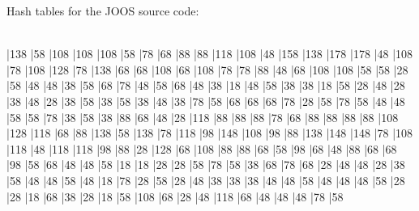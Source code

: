 \begin{slide*}
Hash tables for the JOOS source code:\\
~\\
\begin{barenv}
\setlength{\unitlength}{0.6pt}
\bar{13}{8}
\bar{5}{8}
\bar{10}{8}
\bar{10}{8}
\bar{10}{8}
\bar{5}{8}
\bar{7}{8}
\bar{6}{8}
\bar{8}{8}
\bar{8}{8}
\bar{11}{8}
\bar{10}{8}
\bar{4}{8}
\bar{15}{8}
\bar{13}{8}
\bar{17}{8}
\bar{17}{8}
\bar{4}{8}
\bar{10}{8}
\bar{7}{8}
\bar{10}{8}
\bar{12}{8}
\bar{7}{8}
\bar{13}{8}
\bar{6}{8}
\bar{6}{8}
\bar{10}{8}
\bar{6}{8}
\bar{10}{8}
\bar{7}{8}
\bar{7}{8}
\bar{8}{8}
\bar{4}{8}
\bar{6}{8}
\bar{10}{8}
\bar{10}{8}
\bar{5}{8}
\bar{5}{8}
\bar{2}{8}
\bar{5}{8}
\bar{4}{8}
\bar{4}{8}
\bar{3}{8}
\bar{5}{8}
\bar{6}{8}
\bar{7}{8}
\bar{4}{8}
\bar{5}{8}
\bar{6}{8}
\bar{4}{8}
\bar{3}{8}
\bar{1}{8}
\bar{4}{8}
\bar{5}{8}
\bar{3}{8}
\bar{3}{8}
\bar{1}{8}
\bar{5}{8}
\bar{2}{8}
\bar{4}{8}
\bar{2}{8}
\bar{3}{8}
\bar{4}{8}
\bar{2}{8}
\bar{3}{8}
\bar{5}{8}
\bar{3}{8}
\bar{5}{8}
\bar{3}{8}
\bar{4}{8}
\bar{3}{8}
\bar{7}{8}
\bar{5}{8}
\bar{6}{8}
\bar{6}{8}
\bar{6}{8}
\bar{7}{8}
\bar{2}{8}
\bar{5}{8}
\bar{7}{8}
\bar{5}{8}
\bar{4}{8}
\bar{4}{8}
\bar{5}{8}
\bar{5}{8}
\bar{7}{8}
\bar{3}{8}
\bar{5}{8}
\bar{3}{8}
\bar{8}{8}
\bar{6}{8}
\bar{4}{8}
\bar{2}{8}
\bar{11}{8}
\bar{8}{8}
\bar{8}{8}
\bar{8}{8}
\bar{7}{8}
\bar{6}{8}
\bar{8}{8}
\bar{8}{8}
\bar{8}{8}
\bar{8}{8}
\bar{10}{8}
\bar{12}{8}
\bar{11}{8}
\bar{6}{8}
\bar{8}{8}
\bar{13}{8}
\bar{5}{8}
\bar{13}{8}
\bar{7}{8}
\bar{11}{8}
\bar{9}{8}
\bar{14}{8}
\bar{10}{8}
\bar{9}{8}
\bar{8}{8}
\bar{13}{8}
\bar{14}{8}
\bar{14}{8}
\bar{7}{8}
\bar{10}{8}
\bar{11}{8}
\bar{4}{8}
\bar{11}{8}
\bar{11}{8}
\bar{9}{8}
\bar{8}{8}
\bar{2}{8}
\bar{12}{8}
\bar{6}{8}
\bar{10}{8}
\bar{8}{8}
\bar{8}{8}
\bar{6}{8}
\bar{5}{8}
\bar{9}{8}
\bar{6}{8}
\bar{4}{8}
\bar{8}{8}
\bar{6}{8}
\bar{6}{8}
\bar{9}{8}
\bar{5}{8}
\bar{6}{8}
\bar{4}{8}
\bar{4}{8}
\bar{5}{8}
\bar{1}{8}
\bar{1}{8}
\bar{2}{8}
\bar{2}{8}
\bar{5}{8}
\bar{7}{8}
\bar{5}{8}
\bar{3}{8}
\bar{6}{8}
\bar{7}{8}
\bar{6}{8}
\bar{2}{8}
\bar{4}{8}
\bar{4}{8}
\bar{2}{8}
\bar{3}{8}
\bar{5}{8}
\bar{4}{8}
\bar{4}{8}
\bar{5}{8}
\bar{4}{8}
\bar{1}{8}
\bar{7}{8}
\bar{2}{8}
\bar{5}{8}
\bar{2}{8}
\bar{4}{8}
\bar{3}{8}
\bar{3}{8}
\bar{3}{8}
\bar{4}{8}
\bar{4}{8}
\bar{5}{8}
\bar{4}{8}
\bar{4}{8}
\bar{4}{8}
\bar{5}{8}
\bar{2}{8}
\bar{2}{8}
\bar{1}{8}
\bar{6}{8}
\bar{3}{8}
\bar{2}{8}
\bar{1}{8}
\bar{5}{8}
\bar{10}{8}
\bar{6}{8}
\bar{2}{8}
\bar{4}{8}
\bar{11}{8}
\bar{6}{8}
\bar{4}{8}
\bar{4}{8}
\bar{4}{8}
\bar{7}{8}
\bar{5}{8}

\end{barenv}
\end{slide*}
